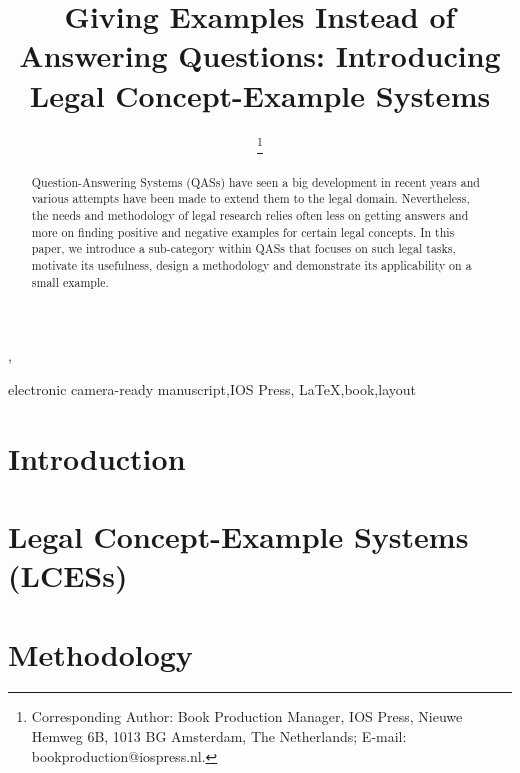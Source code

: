 \documentclass{IOS-Book-Article}
\theoremstyle{definition}
\begin{document}
\begin{frontmatter}              %

\title{Giving Examples Instead of Answering Questions: Introducing Legal Concept-Example Systems}

\author[A]{ %
\thanks{Corresponding Author: Book Production Manager, IOS Press, Nieuwe Hemweg 6B,
1013 BG Amsterdam, The Netherlands; E-mail:
bookproduction@iospress.nl.}},
\author[B]{ }

\address[A]{Book Production Department, IOS Press, The Netherlands}
\address[B]{Computer Science Institute, AGH University of Krakow, Poland}

\begin{abstract}
Question-Answering Systems (QASs) have seen a big development in recent years and various attempts have been made to extend them to the legal domain. Nevertheless, the needs and methodology of legal research relies often less on getting answers and more on finding positive and negative examples for certain legal concepts. In this paper, we introduce a sub-category within QASs that focuses on such legal tasks, motivate its usefulness, design a methodology and demonstrate its applicability on a small example.
\end{abstract}

\begin{keyword}
electronic camera-ready manuscript\sep IOS Press\sep
\LaTeX\sep book\sep layout
\end{keyword}
\end{frontmatter}

\thispagestyle{empty}
\pagestyle{empty}

\section{Introduction}



\section{Legal Concept-Example Systems (LCESs)}
\label{sec:lces}




\section{Methodology}
\label{sec:method}
\end{document}
